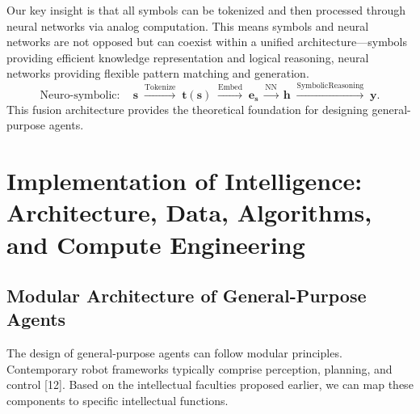 \documentclass[12pt,a4paper]{article}
\begin{document}
Our key insight is that all symbols can be tokenized and then processed through neural networks via analog computation. This means symbols and neural networks are not opposed but can coexist within a unified architecture---symbols providing efficient knowledge representation and logical reasoning, neural networks providing flexible pattern matching and generation.
\begin{equation}
\text{Neuro-symbolic}:\quad
\mathbf{s}\;\xrightarrow{\mathrm{Tokenize}}\;\mathbf{t}(\mathbf{s})
\;\xrightarrow{\mathrm{Embed}}\;\mathbf{e}_{\mathbf{s}}
\;\xrightarrow{\mathrm{NN}}\;\mathbf{h}
\;\xrightarrow{\mathrm{SymbolicReasoning}}\;\mathbf{y}.
\label{eq:neuro-symbolic}
\end{equation}
This fusion architecture provides the theoretical foundation for designing general-purpose agents.

\section{Implementation of Intelligence: Architecture, Data, Algorithms, and Compute Engineering}
\subsection{Modular Architecture of General-Purpose Agents}
The design of general-purpose agents can follow modular principles. Contemporary robot frameworks typically comprise perception, planning, and control [12]. Based on the intellectual faculties proposed earlier, we can map these components to specific intellectual functions.
\end{document}
